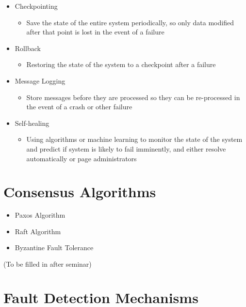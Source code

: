 \begin{itemize}
  \item Checkpointing
  \begin{itemize}
    \item Save the state of the entire system periodically, so only data modified after that point is lost in the event of a failure
  \end{itemize}
  \item Rollback
  \begin{itemize}
    \item Restoring the state of the system to a checkpoint after a failure
  \end{itemize}
  \item Message Logging
  \begin{itemize}
    \item Store messages before they are processed so they can be re-processed in the event of a crash or other failure
  \end{itemize}
  \item Self-healing
  \begin{itemize}
    \item Using algorithms or machine learning to monitor the state of the system and predict if system is likely to fail imminently, and either resolve automatically or page administrators
  \end{itemize}
\end{itemize}

\section*{Consensus Algorithms}

\begin{itemize}
  \item Paxos Algorithm
  \item Raft Algorithm
  \item Byzantine Fault Tolerance
\end{itemize}

(To be filled in after seminar)

\section*{Fault Detection Mechanisms}

